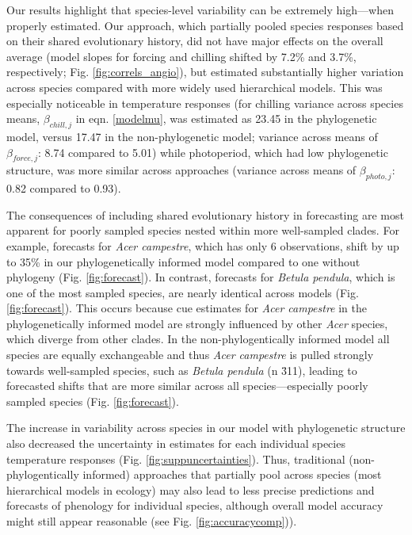 \documentclass[11pt]{article}
\begin{document}
Our results highlight that species-level variability can be extremely high---when properly estimated. Our approach, which partially pooled species responses based on their shared evolutionary history, did not have major effects on the overall average (model slopes for forcing and chilling shifted by 7.2\% and 3.7\%, respectively; Fig. \ref{fig:correls_angio}), but estimated substantially higher variation across species compared with more widely used hierarchical models. This was especially noticeable in temperature responses (for chilling variance across species means, $\beta_{chill,j}$ in eqn. \ref{modelmu}, was estimated as 23.45 in the phylogenetic model, versus 17.47 in the non-phylogenetic model; variance across means of $\beta_{force,j}$: 8.74 compared to 5.01) while photoperiod, which had low phylogenetic structure, was more similar across approaches (variance across means of $\beta_{photo,j}$: 0.82 compared to 0.93). %

The consequences of including shared evolutionary history in forecasting are most apparent for poorly sampled species nested within more well-sampled clades. For example, forecasts for \emph{Acer campestre}, which has only 6 observations, shift by up to 35\% in our phylogenetically informed model compared to one without phylogeny (Fig. \ref{fig:forecast}). In contrast, forecasts for \emph{Betula pendula}, which is one of the most sampled species, are nearly identical across models (Fig. \ref{fig:forecast}). This occurs because cue estimates for \emph{Acer campestre} in the phylogenetically informed model are strongly influenced by other \emph{Acer} species, which diverge from other clades. In the non-phylogentically informed model all species are equally exchangeable and thus \emph{Acer campestre} is pulled strongly towards well-sampled species, such as \emph{Betula pendula} (n \= 311), leading to forecasted shifts that are more similar across all species---especially poorly sampled species (Fig. \ref{fig:forecast}). 

The increase in variability across species in our model with phylogenetic structure also decreased the uncertainty in estimates for each individual species temperature responses (Fig. \ref{fig:suppuncertainties}). Thus, traditional (non-phylogentically informed) approaches that partially pool across species (most hierarchical models in ecology) may also lead to less precise predictions and forecasts of phenology for individual species, although overall model accuracy might still appear reasonable (see Fig. \ref{fig:accuracycomp})).
\end{document}
